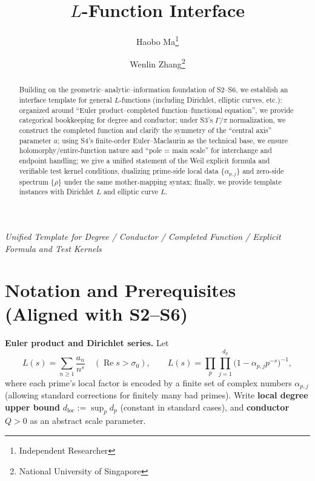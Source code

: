 \documentclass[11pt,a4paper]{article}
\title{$L$-Function Interface}
\author{Haobo Ma\thanks{Independent Researcher} \and Wenlin Zhang\thanks{National University of Singapore}}
\date{}
\theoremstyle{remark}
\DeclareMathOperator{\Re}{Re}
\begin{document}
\maketitle

\begin{center}
\textit{Unified Template for Degree / Conductor / Completed Function / Explicit Formula and Test Kernels}
\end{center}

\begin{abstract}
Building on the geometric--analytic--information foundation of S2--S6, we establish an interface template for general $L$-functions (including Dirichlet, elliptic curves, etc.): organized around ``Euler product--completed function--functional equation'', we provide categorical bookkeeping for degree and conductor; under S3's $\Gamma/\pi$ normalization, we construct the completed function and clarify the symmetry of the ``central axis'' parameter $a$; using S4's finite-order Euler--Maclaurin as the technical base, we ensure holomorphy/entire-function nature and ``pole = main scale'' for interchange and endpoint handling; we give a unified statement of the Weil explicit formula and verifiable test kernel conditions, dualizing prime-side local data $\{\alpha_{p,j}\}$ and zero-side spectrum $\{\rho\}$ under the same mother-mapping syntax; finally, we provide template instances with Dirichlet $L$ and elliptic curve $L$.
\end{abstract}

\section{Notation and Prerequisites (Aligned with S2--S6)}

\textbf{Euler product and Dirichlet series.} Let
\begin{equation}
L(s)=\sum_{n\ge1}\frac{a_n}{n^s}\quad(\Re s>\sigma_0),\qquad
L(s)=\prod_{p}\prod_{j=1}^{d_p}\bigl(1-\alpha_{p,j}p^{-s}\bigr)^{-1},
\end{equation}
where each prime's local factor is encoded by a finite set of complex numbers $\alpha_{p,j}$ (allowing standard corrections for finitely many bad primes). Write \textbf{local degree upper bound} $d_{\mathrm{loc}}:=\sup_p d_p$ (constant in standard cases), and \textbf{conductor} $Q>0$ as an abstract scale parameter.
\end{document}
